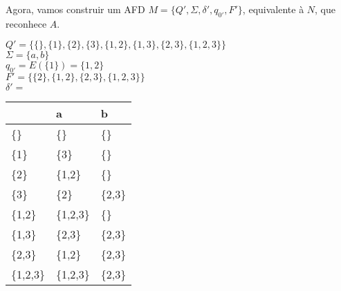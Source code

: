 Agora, vamos construir um AFD $M = \{Q', \Sigma, \delta', q_{0'}, F'\}$, equivalente à $N$, que reconhece $A$.

\noindent$Q' = \{\{\}, \{1\}, \{2\}, \{3\}, \{1,2\}, \{1,3\}, \{2,3\}, \{1,2,3\} \}$\\
$\Sigma = \{a, b\}$\\
$q_{0'} = E(\{1\}) = \{1,2\}$\\
$F' = \{\{2\}, \{1,2\}, \{2,3\}, \{1,2,3\} \}$\\
$\delta' = $
\begin{table}[!h]
\centering
{}
\begin{tabular}{l|l|l}
            & a             & b         \\ \hline
\{\}        & \{\}          & \{\}      \\
\{1\}       & \{3\}         & \{\}      \\
\{2\}       & \{1,2\}       & \{\}      \\
\{3\}       & \{2\}         & \{2,3\}   \\
\{1,2\}     & \{1,2,3\}     & \{\}      \\
\{1,3\}     & \{2,3\}       & \{2,3\}   \\
\{2,3\}     & \{1,2\}       & \{2,3\}   \\
\{1,2,3\}   & \{1,2,3\}     & \{2,3\}
\end{tabular}
\end{table}

